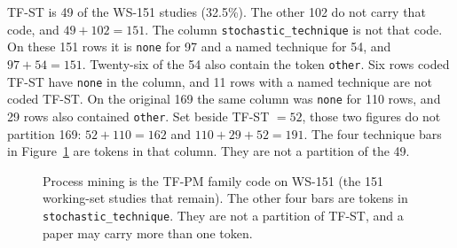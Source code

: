 TF-ST is 49 of the WS-151 studies (32.5\%). The other 102 do not carry that code,
and $49+102=151$. The column \texttt{stochastic\_technique} is not that
code. On these 151 rows it is \texttt{none} for 97 and a named technique
for 54, and $97+54=151$. Twenty-six of the 54 also contain the token
\texttt{other}. Six rows coded TF-ST have \texttt{none} in the column, and
11 rows with a named technique are not coded TF-ST. On the original 169
the same column was \texttt{none} for 110 rows, and 29 rows also contained
\texttt{other}. Set beside TF-ST $=52$, those two figures do not partition
169: $52+110=162$ and $110+29+52=191$. The four technique bars in
Figure~\ref{fig:pdf-technique-dist} are tokens in that column. They are
not a partition of the 49.

\begin{figure}[tbp]
\centering
{}
\caption{Process mining is the TF-PM family code on WS-151 (the 151
working-set studies that remain). The other four bars are tokens in
\texttt{stochastic\_technique}. They are not a partition of TF-ST, and a
paper may carry more than one token.}
\label{fig:pdf-technique-dist}
\end{figure}

